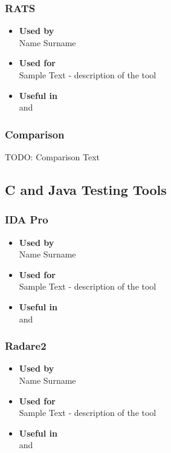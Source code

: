 \subsubsection*{RATS}
\begin{itemize}
	\item \textbf{Used by}\\ Name Surname
	\item \textbf{Used for}\\ Sample Text - description of the tool
	\item \textbf{Useful in}\\  and 
\end{itemize}

\subsubsection*{Comparison}
TODO: Comparison Text


\subsection*{C and Java Testing Tools}

\subsubsection*{IDA Pro}
\begin{itemize}
	\item \textbf{Used by}\\ Name Surname
	\item \textbf{Used for}\\ Sample Text - description of the tool
	\item \textbf{Useful in}\\  and 
\end{itemize}

\subsubsection*{Radare2}
\begin{itemize}
	\item \textbf{Used by}\\ Name Surname
	\item \textbf{Used for}\\ Sample Text - description of the tool
	\item \textbf{Useful in}\\  and 
\end{itemize}

